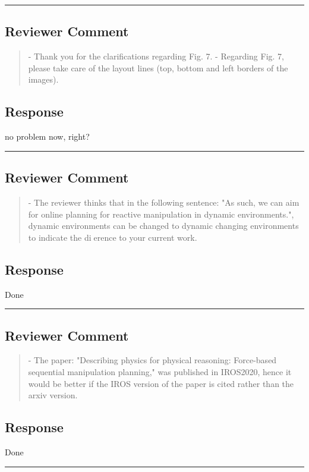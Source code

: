 \noindent\rule{17cm}{2.0pt}

\subsection{Reviewer Comment}
\begin{mdframed}
\begin{quote}
- Thank you for the clarifications regarding Fig. 7.
- Regarding Fig. 7, please take care of the layout lines (top, bottom and left borders of the images).
\end{quote}
\end{mdframed}

\subsection{Response} 

no problem now, right?

\noindent\rule{17cm}{2.0pt}

\subsection{Reviewer Comment}
\begin{mdframed}
\begin{quote}
- The reviewer thinks that in the following sentence: "As such, we can aim for online planning for reactive
manipulation in dynamic environments.", dynamic environments can be changed to dynamic changing
environments to indicate the dierence to your current work.
\end{quote}
\end{mdframed}

\subsection{Response} 

Done

\noindent\rule{17cm}{2.0pt}

\subsection{Reviewer Comment}
\begin{mdframed}
\begin{quote}
- The paper: "Describing physics for physical reasoning: Force-based sequential manipulation planning,"
was published in IROS2020, hence it would be better if the IROS version of the paper is cited rather
than the arxiv version.
\end{quote}
\end{mdframed}

\subsection{Response} 

Done

\noindent\rule{17cm}{2.0pt}

